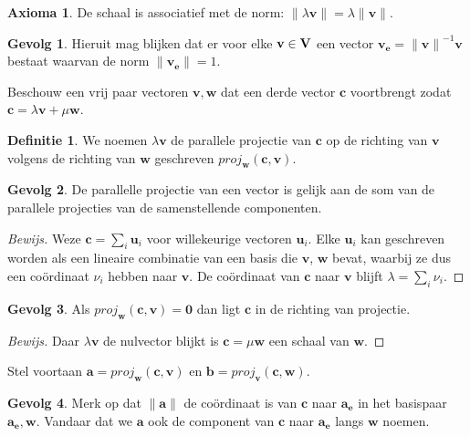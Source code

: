 \documentclass{amsart}
\theoremstyle{definition}
\newtheorem{axm}{Axioma}[section]
\newtheorem{dfn}{Definitie}[section]
\newtheorem{csq}{Gevolg}[section]
\newenvironment{bewijs}{\begin{proof}[Bewijs]}{\end{proof}}
\newcommand{\vecspace}[1][v]{\mathrm{\mathbf{\MakeUppercase#1}}}
\newcommand{\norm}[1]{\lVert{#1}\rVert}
\newcommand{\vvec}[1][v]{\mathbf{#1}}
\newcommand{\uvec}[1][v]{\vvec[#1]_\mathbf{e}}
\newcommand{\vnorm}[1]{\norm{\vvec[#1]}}
\newcommand{\zerovec}{\vvec[0]}
\begin{document}
\begin{axm}
	De schaal is associatief met de norm: $\norm{\lambda \vvec} = \lambda\vnorm v$.
\end{axm}

\begin{csq}
	Hieruit mag blijken dat er voor elke $\vvec \in \vecspace$ een vector $\uvec = {\vnorm v}^{-1}\vvec$ bestaat waarvan de norm $\vnorm \uvec = 1$.
\end{csq}

Beschouw een vrij paar vectoren $\vvec, \vvec[w]$ dat een derde vector $\vvec[c]$ voortbrengt zodat $\vvec[c] = \lambda \vvec + \mu \vvec[w]$.

\begin{dfn}
	We noemen $\lambda\vvec$ de parallele projectie van $\vvec[c]$ op de richting van $\vvec$ volgens de richting van $\vvec[w]$ geschreven $proj_{\vvec[w]}(\vvec[c], \vvec)$.
\end{dfn}

\begin{csq}
	De parallelle projectie van een vector is gelijk aan de som van de parallele projecties van de samenstellende componenten.
	\begin{bewijs}
		Weze $\vvec[c] = \sum_{i} {\vvec[u]}_i$ voor willekeurige vectoren $\vvec[u]_i$.
		Elke ${\vvec[u]}_i$ kan geschreven worden als een lineaire combinatie van een basis die $\vvec$, $\vvec[w]$ bevat, waarbij ze dus een coördinaat $\nu_i$ hebben naar $\vvec$.
		De coördinaat van $\vvec[c]$ naar $\vvec$ blijft $\lambda = \sum_i \nu_i$.
	\end{bewijs}
\end{csq}

\begin{csq}
	Als $proj_{\vvec[w]}(\vvec[c], \vvec) = \zerovec$ dan ligt $\vvec[c]$ in de richting van projectie.
	\begin{bewijs}
		Daar $\lambda\vvec$ de nulvector blijkt is $\vvec[c] = \mu\vvec[w]$ een schaal van $\vvec[w]$.
	\end{bewijs}
\end{csq}

Stel voortaan $\vvec[a] = proj_{\vvec[w]}(\vvec[c], \vvec)$ en $\vvec[b] = proj_{\vvec}(\vvec[c], \vvec[w])$.

\begin{csq}
	Merk op dat $\vnorm{a}$ de coördinaat is van $\vvec[c]$ naar $\uvec[a]$ in het basispaar $\uvec[a], \vvec[w]$.
	Vandaar dat we $\vvec[a]$ ook de component van $\vvec[c]$ naar $\uvec[a]$ langs $\vvec[w]$ noemen.
\end{csq}
\end{document}
